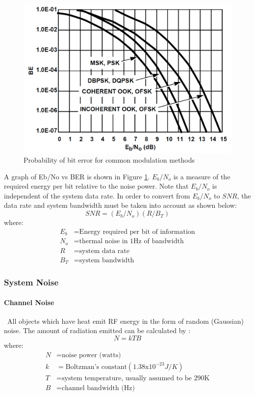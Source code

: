 \begin{figure}[h]
	\includegraphics[scale=0.3]{./sections/SatelliteDesign/images/BEvsSNR}
	\centering
	\caption{Probability of bit error for common modulation methods \cite{Note1998}}
	\label{BEvsSNR}
\end{figure}
A graph of Eb/No
vs BER is shown in Figure \ref{BEvsSNR}. $E_b/N_o$ is a measure of the
required energy per bit relative to the noise power. Note that
$E_b/N_o$ is independent of the system data rate. In order to
convert from $E_b/N_o$ to $SNR$, the data rate and system
bandwidth must be taken into account as shown below:
\begin{equation}
SNR=(E_b/N_o)(R/B_T)
\label{SNReq}
\end{equation}
where:
\begin{align*}
	E_b&= \text{Energy required per bit of information}\\
	N_o&= \text{thermal noise in 1Hz of bandwidth}\\
	R&= \text{system data rate}\\
	B_T&= \text{system bandwidth}
\end{align*}


\subsubsection{System Noise}
\paragraph{Channel Noise}
\
All objects which have heat emit RF energy in the form of random (Gaussian) noise. The amount of radiation emitted can be calculated by \cite{Note1998}:
\begin{equation}
N=kTB
\label{noise}
\end{equation}
where:
\begin{align*}
	N&= \text{noise power (watts)}\\
	k&= \text{Boltzman's constant}(1.38\mathrm{x}10^{-23}J/K)\\
	T&= \text{system temperature, usually assumed to be 290K}\\
	B&= \text{channel bandwidth (Hz)}
\end{align*}

